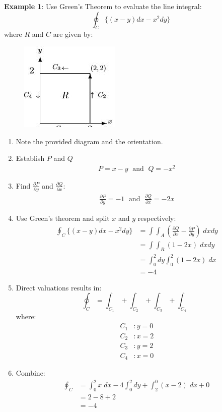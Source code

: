 \documentclass[10pt,a4paper]{article}
\begin{document}
\textbf{Example 1}: Use Green's Theorem to evaluate the line integral: 
$$\oint_C \{(x-y)dx - x^2dy\}$$
where $R$ and $C$ are given by:
\begin{figure} [h!]
    \centering
    \includegraphics[]{Gex1.JPG}
\end{figure}

\begin{enumerate}
    \item Note the provided diagram and the orientation.
    \item Establish $P$ and $Q$ 
    \begin{align*}
        P = x - y \; \text{ and } \; Q = -x^2
    \end{align*}
    \item Find $\frac{\partial P}{\partial y}$ and $\frac{\partial Q}{\partial x}$:
    \begin{align*}
        \frac{\partial P}{\partial y} = -1 \; \text{ and } \; \frac{\partial Q}{\partial x} = -2x
    \end{align*}
    \item Use Green's theorem and split $x$ and $y$ respectively:
    \begin{align*}
        \oint_C \{(x-y)dx - x^2dy\} &= \int\int_A \left(\frac{\partial Q}{\partial x}-\frac{\partial P}{\partial y}\right)\; dxdy \\
        &= \int \int_R (1-2x)\; dxdy \\
        &= \int_0^2 dy \int_0^2 (1-2x) \; dx \\
        &= -4
    \end{align*}
    \item Direct valuations results in:
    $$
        \oint_C = \int_{C_1} + \int_{C_2} + \int_{C_3} + \int_{C_4}
    $$
    where:
    \begin{align*}
        C_1&: y = 0 \\
        C_2&: x = 2 \\
        C_3&: y = 2 \\
        C_4&: x = 0
    \end{align*}
    \item Combine:
    \begin{align*}
        \oint_C &= \int_0^2 x\; dx -4\int_0^2 dy + \int_2^0(x-2)\; dx + 0 \\
        &= 2 - 8 + 2 \\
        &= -4
    \end{align*}
\end{enumerate}
\end{document}
